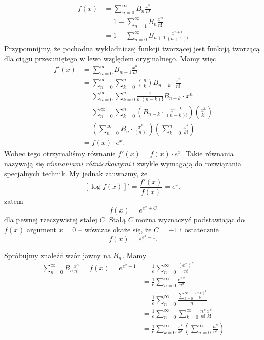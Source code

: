 \documentclass[shortabstract]{imthesis}
\begin{document}
\begin{align*}
    f(x) &= \sum_{n=0}^\infty B_n \frac{x^n}{n!} \\
     &= 1 + \sum_{n=1}^\infty B_n \frac{x^n}{n!} \\
     &= 1 + \sum_{n=0}^\infty B_{n+1} \frac{x^{n+1}}{(n+1)!}
\end{align*}
Przypomnijmy, że pochodna wykładniczej funkcji tworzącej jest funkcją tworzącą dla ciągu przesuniętego w lewo względem oryginalnego. Mamy więc
\begin{align*}
    f'(x) &= \sum_{n=0}^\infty B_{n+1} \frac{x^n}{n!} \\
    &= \sum_{n=0}^\infty \sum_{k=0}^{n} {n \choose k} B_{n-k} \cdot \frac{x^n}{n!} \\
    &= \sum_{n=0}^\infty \sum_{k=0}^{n} \frac{1}{k!(n-k)!} B_{n-k} \cdot x^n \\
    &= \sum_{n=0}^\infty \sum_{k=0}^{n} \left(B_{n-k} \cdot \frac{x^{n-k}}{(n-k)!}\right) \left(\frac{x^k}{k!}\right) \\
    &= \left( \sum_{n=0}^\infty B_{n} \cdot \frac{x^{n}}{(n)!}\right) \left(\sum_{k=0}^{n} \frac{x^k}{k!}\right) \\
    &= f(x) \cdot e^x. 
\end{align*}
Wobec tego otrzymaliśmy równanie $f'(x) = f(x) \cdot e^x$. Takie równania nazywają się \emph{równaniami różniczkowymi} i zwykle wymagają do rozwiązania specjalnych technik. My jednak zauważmy, że
$$
[\log f(x)]' = \frac{f'(x)}{f(x)} = e^x,
$$
zatem 
$$
f(x) = e^{e^x + C}
$$
dla pewnej rzeczywistej stałej $C$. Stałą $C$ można wyznaczyć podstawiając do $f(x)$ argument $x = 0$ -- wówczas okaże się, że $C = -1$ i ostatecznie
$$
f(x) = e^{e^x - 1}.
$$

Spróbujmy znaleźć wzór jawny na $B_n$. Mamy
\begin{align*}
    \sum_{n=0}^\infty B_n \frac{x^n}{n!} = f(x) = e^{e^x-1} &= \frac{1}{e} \sum_{n=0}^\infty \frac{(e^x)^n}{n!} \\
    &= \frac{1}{e} \sum_{n=0}^\infty \frac{e^{nx}}{n!} \\
    &= \frac{1}{e} \sum_{n=0}^\infty \frac{\sum_{k=0}^\infty \frac{(nx)^k}{k!}}{n!} \\
    &= \frac{1}{e} \sum_{n=0}^\infty \sum_{k=0}^\infty \frac{n^k}{n!} \frac{x^k}{k!} \\
    &= \frac{1}{e} \sum_{k=0}^\infty \frac{x^k}{k!} \left(\sum_{n=0}^\infty  \frac{n^k}{n!}\right)  \\
\end{align*}
\end{document}
